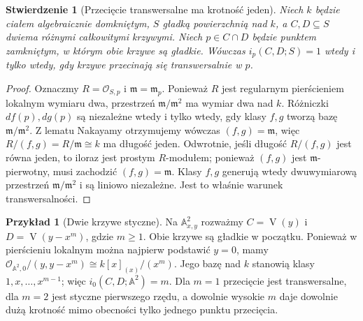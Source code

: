 \documentclass[11pt,a4paper,openany]{report}
\numberwithin{equation}{section}
\theoremstyle{plain}
\newtheorem{stwierdzenie}[twierdzenie]{Stwierdzenie}
\theoremstyle{definition}
\newtheorem{przyklad}[twierdzenie]{Przykład}
\theoremstyle{remark}
\newcommand{\A}{\mathbb A}
\newcommand{\V}{\operatorname V}
\begin{document}
\begin{stwierdzenie}[Przecięcie transwersalne ma krotność jeden]
\label{st:ga6-transversal-one}
Niech $k$ będzie ciałem algebraicznie domkniętym,
$S$ gładką powierzchnią nad $k$, a $C,D\subseteq S$
dwiema różnymi całkowitymi krzywymi. Niech $p\in C\cap D$
będzie punktem zamkniętym, w którym obie krzywe są gładkie.
Wówczas $i_p(C,D;S)=1$ wtedy i tylko wtedy,
gdy krzywe przecinają się transwersalnie w $p$.
\end{stwierdzenie}
\begin{proof}
Oznaczmy $R=\mathcal O_{S,p}$ i $\mathfrak m=\mathfrak m_p$.
Ponieważ $R$ jest regularnym pierścieniem lokalnym wymiaru dwa,
przestrzeń $\mathfrak m/\mathfrak m^2$ ma wymiar dwa nad $k$.
Różniczki $df(p),dg(p)$ są niezależne wtedy i tylko wtedy,
gdy klasy $f,g$ tworzą bazę $\mathfrak m/\mathfrak m^2$.
Z lematu Nakayamy otrzymujemy wówczas $(f,g)=\mathfrak m$,
więc $R/(f,g)=R/\mathfrak m\cong k$ ma długość jeden.
Odwrotnie, jeśli długość $R/(f,g)$ jest równa jeden,
to iloraz jest prostym $R$-modułem; ponieważ $(f,g)$ jest
$\mathfrak m$-pierwotny, musi zachodzić $(f,g)=\mathfrak m$.
Klasy $f,g$ generują wtedy dwuwymiarową przestrzeń
$\mathfrak m/\mathfrak m^2$ i są liniowo niezależne.
Jest to właśnie warunek transwersalności.
\end{proof}

\begin{przyklad}[Dwie krzywe styczne]
\label{prz:ga6-tangent}
Na $\A^2_{x,y}$ rozważmy $C=\V(y)$ i $D=\V(y-x^m)$,
gdzie $m\ge1$. Obie krzywe są gładkie w początku.
Ponieważ w pierścieniu lokalnym można najpierw podstawić
$y=0$, mamy
$\mathcal O_{\A^2,0}/(y,y-x^m)\cong k[x]_{(x)}/(x^m)$.
Jego bazę nad $k$ stanowią klasy $1,x,\ldots,x^{m-1}$;
więc $i_0(C,D;\A^2)=m$. Dla $m=1$ przecięcie jest
transwersalne, dla $m=2$ jest styczne pierwszego rzędu,
a dowolnie wysokie $m$ daje dowolnie dużą krotność mimo
obecności tylko jednego punktu przecięcia.
\end{przyklad}
\end{document}
